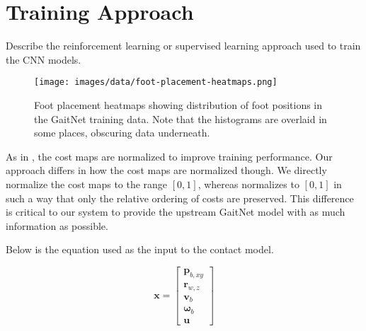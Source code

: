 \section{Training Approach}

\begin{outline}
  Describe the reinforcement learning or supervised learning approach
  used to train the CNN models.
\end{outline}

\begin{figure}
  \centering
  \texttt{[image: images/data/foot-placement-heatmaps.png]}
  \caption{Foot placement heatmaps showing distribution of foot
    positions in the GaitNet training data. Note that the histograms
  are overlaid in some places, obscuring data underneath.}
  \label{fig:data-cn-training-process}
\end{figure}

As in \cite{bratta_contactnet_2024}, the cost maps are normalized to
improve training performance. Our approach differs in how the cost
maps are normalized though. We directly normalize the cost maps to
the range $[0, 1]$, whereas \cite{bratta_contactnet_2024} normalizes
to $[0,1]$ in such a way that only the relative ordering of costs are
preserved. This difference is critical to our system to provide the
upstream GaitNet model with as much information as possible.



Below is the equation used as the input to the contact model.

\[
  \mathbf{x} =
  \begin{bmatrix}
    \mathbf p_{b,xy} \\
    \mathbf r_{w,z} \\
    \mathbf v_b \\
    \mathbf \omega_b \\
    \mathbf u
  \end{bmatrix}
\]

